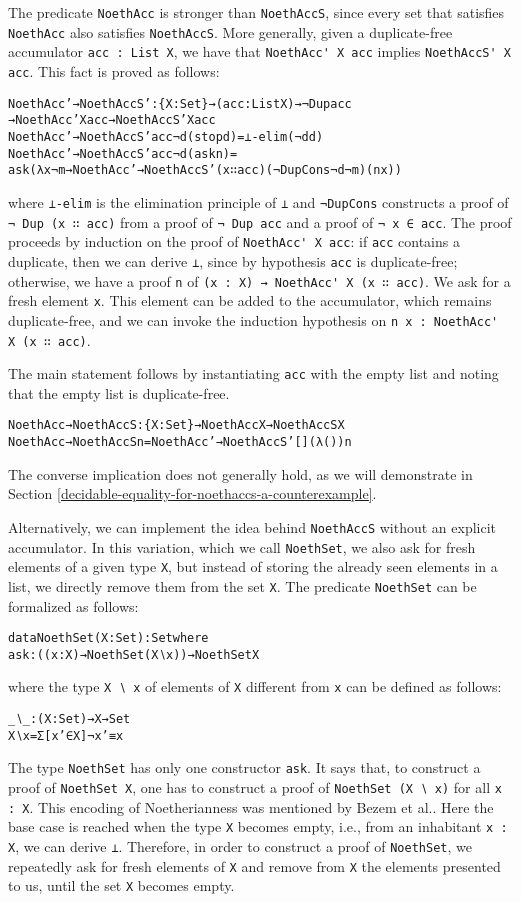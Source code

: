 \documentclass{eptcs}
\begin{document}
The predicate \verb;NoethAcc; is stronger than \verb;NoethAccS;, since every set
that satisfies \verb;NoethAcc; also satisfies \verb;NoethAccS;. More generally,
given a duplicate-free accumulator \verb;acc : List X;, we have that
\verb;NoethAcc' X acc; implies \verb;NoethAccS' X acc;. This fact is proved as
follows:
\begin{alltt}
NoethAcc'→NoethAccS' : \{X : Set\} → (acc : List X) → ¬ Dup acc
  → NoethAcc' X acc → NoethAccS' X acc
NoethAcc'→NoethAccS' acc ¬d (stop d) = ⊥-elim (¬d d)
NoethAcc'→NoethAccS' acc ¬d (ask n) =
  ask (λ x ¬m → NoethAcc'→NoethAccS' (x ∷ acc) (¬DupCons ¬d ¬m) (n x))
\end{alltt}
where \verb;⊥-elim; is the elimination principle of \verb;⊥; and \verb;¬DupCons;
constructs a proof of \verb;¬ Dup (x ∷ acc); from a proof of \verb;¬ Dup acc;
and a proof of \verb;¬ x ∈ acc;. The proof proceeds by induction on the proof of
\verb;NoethAcc' X acc;: if \verb;acc; contains a duplicate, then we can derive
\verb;⊥;, since by hypothesis \verb;acc; is duplicate-free; otherwise, we have a
proof \verb;n; of \verb;(x : X) → NoethAcc' X (x ∷ acc);. We ask for a fresh
element \verb+x+. This element can be added to the accumulator, which remains
duplicate-free, and we can invoke the induction hypothesis on 
\verb;n x : NoethAcc' X (x ∷ acc);.

The main statement follows by instantiating \verb;acc; with the empty list and
noting that the empty list is duplicate-free.
\begin{alltt}
NoethAcc→NoethAccS : \{X : Set\} → NoethAcc X → NoethAccS X
NoethAcc→NoethAccS n = NoethAcc'→NoethAccS' [] (λ ()) n
\end{alltt}
The converse implication does not generally hold, as we will demonstrate in
Section \ref{decidable-equality-for-noethaccs-a-counterexample}.

Alternatively, we can implement the idea behind \verb;NoethAccS; without an
explicit accumulator. In this variation, which we call \verb;NoethSet;, we also
ask for fresh elements of a given type \verb;X;, but instead of storing the
already seen elements in a list, we directly remove them from the set \verb;X;.
The predicate \verb;NoethSet; can be formalized as follows:
\begin{alltt}
data NoethSet (X : Set) : Set where
  ask : ((x : X) → NoethSet (X ∖ x)) → NoethSet X
\end{alltt}
where the type \verb;X ∖ x; of elements of \verb;X; different from
\verb;x; can be defined as follows:
\begin{alltt}
_∖_ : (X : Set) → X → Set
X ∖ x = Σ[ x' ∈ X ] ¬ x' ≡ x 
\end{alltt}
The type \verb;NoethSet; has only one constructor \verb;ask;.  It says
that, to construct a proof of \verb;NoethSet X;, one has 
to construct a proof of \verb;NoethSet (X ∖ x); for all
\verb+x : X+.
This encoding of Noetherianness was mentioned by Bezem et al.\cite{Uustalu}. 
Here the base case is reached when the type \verb+X+
becomes empty, i.e., from an inhabitant \verb+x : X+, we can derive
\verb+⊥+. Therefore, in order to construct a proof of \verb+NoethSet+,
we repeatedly ask for fresh elements of \verb+X+ and remove from
\verb+X+ the elements presented to us, until the set \verb+X+ becomes empty.
\end{document}
